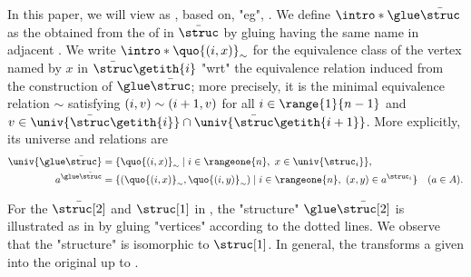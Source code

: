 \documentclass[a4paper,UKenglish,cleveref, autoref, thm-restate]{lipics-v2021}
\DeclarePairedDelimiter\set{\{}{\}}
\DeclarePairedDelimiter\tuple{(}{)}
\newcommand{\mul}[1]{\bar{#1}}
\begin{document}
%
In this paper, we will view  as \emph{}, based on, "eg", \cite{nakamuraPartialDerivativesGraphs2017,nakamuraDerivativesGraphsPositive2025}.
\AP {}
We define $\intro*\glue \mul{\struc}$ \cite[Definition 5.1]{nakamuraDerivativesGraphsPositive2025} as the 
obtained from the  of  in $\mul{\struc}$ by gluing  having the same name in adjacent .
We write $\intro*\quo{\tuple{i, x}}_{\sim}$ for the 
equivalence class of the vertex named by $x$ in $\mul{\struc}\getith{i}$ "wrt" the equivalence relation induced from the construction of $\glue \mul{\struc}$; more precisely, it is the minimal equivalence relation $\sim$
satisfying $\tuple{i, v} \sim \tuple{i+1, v}$ for all $i \in \range{1}{n-1}$ and $v \in \univ{\mul{\struc}\getith{i}} \cap \univ{\mul{\struc}\getith{i+1}}$.
More explicitly, its universe and relations are
\begin{align*}
\univ{\glue\mul{\struc}}
&= \set{\quo{\tuple{i,x}}_{\sim} \mid i \in \rangeone{n},\ x \in \univ{\struc_i}},\\
a^{\glue\mul{\struc}}
&= \set{\tuple{\quo{\tuple{i,x}}_{\sim},\quo{\tuple{i,y}}_{\sim}} \mid i \in \rangeone{n},\ \tuple{x,y} \in a^{\struc_i}}
\quad (a \in A).
\end{align*}
\begin{example}
For the $\mul{\struc[2]}$ and $\struc[1]$ in ,
the "structure" $\glue \mul{\struc[2]}$ is illustrated as in  by gluing "vertices" according to the dotted lines.
We observe that the "structure" is isomorphic to $\struc[1]$.
In general, the  transforms a given  into the original  up to .
\end{example}
\end{document}
